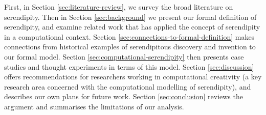 First, in
Section \ref{sec:literature-review}, we survey the broad literature on
serendipity. Then in Section \ref{sec:background} we present our formal
definition of serendipity, and examine related work that has applied
the concept of serendipity in a computational context. Section \ref{sec:connections-to-formal-definition} makes connections from historical examples of
serendipitous discovery and invention to our formal model.  Section
\ref{sec:computational-serendipity} then presents case studies and
thought experiments in terms of this model.  Section
\ref{sec:discussion} offers recommendations for researchers working in
computational creativity (a key research area concerned with the computational modelling of serendipity), and describes our own plans for future
work.  Section \ref{sec:conclusion} reviews the argument and
summarises the limitations of our analysis.



